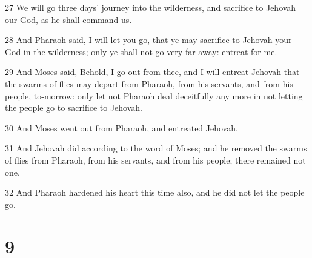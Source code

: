 \par 27 We will go three days' journey into the wilderness, and sacrifice to Jehovah our God, as he shall command us.
\par 28 And Pharaoh said, I will let you go, that ye may sacrifice to Jehovah your God in the wilderness; only ye shall not go very far away: entreat for me.
\par 29 And Moses said, Behold, I go out from thee, and I will entreat Jehovah that the swarms of flies may depart from Pharaoh, from his servants, and from his people, to-morrow: only let not Pharaoh deal deceitfully any more in not letting the people go to sacrifice to Jehovah.
\par 30 And Moses went out from Pharaoh, and entreated Jehovah.
\par 31 And Jehovah did according to the word of Moses; and he removed the swarms of flies from Pharaoh, from his servants, and from his people; there remained not one.
\par 32 And Pharaoh hardened his heart this time also, and he did not let the people go.

\chapter{9}

